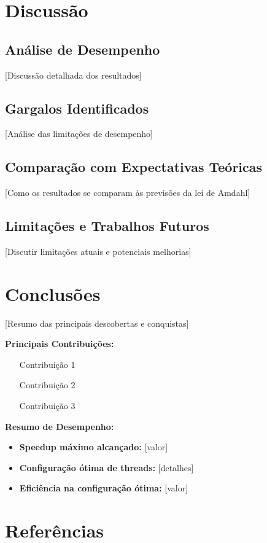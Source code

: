 \documentclass[a4paper,11pt]{article}
\begin{document}
\section{Discussão}

\subsection{Análise de Desempenho}
[Discussão detalhada dos resultados]

\subsection{Gargalos Identificados}
[Análise das limitações de desempenho]

\subsection{Comparação com Expectativas Teóricas}
[Como os resultados se comparam às previsões da lei de Amdahl]

\subsection{Limitações e Trabalhos Futuros}
[Discutir limitações atuais e potenciais melhorias]

\section{Conclusões}

[Resumo das principais descobertas e conquistas]

\textbf{Principais Contribuições:}
\begin{itemize}
    \item [Contribuição 1]
    \item [Contribuição 2]
    \item [Contribuição 3]
\end{itemize}

\textbf{Resumo de Desempenho:}
\begin{itemize}
    \item \textbf{Speedup máximo alcançado:} [valor]
    \item \textbf{Configuração ótima de threads:} [detalhes]
    \item \textbf{Eficiência na configuração ótima:} [valor]
\end{itemize}

\section{Referências}
\end{document}
